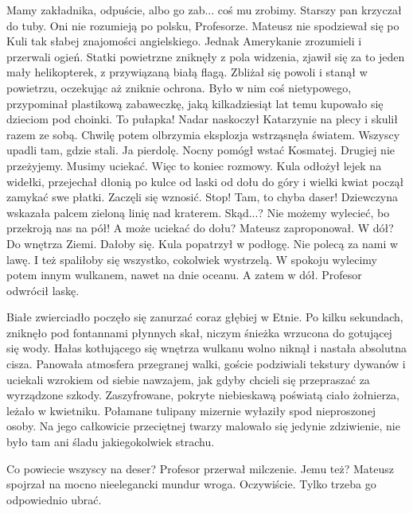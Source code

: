 \begin{dialogue}
\ds{} Mamy zakładnika, odpuście, albo go zab... coś mu zrobimy. \dm{} Starszy pan krzyczał do tuby.
\ds{} Oni nie rozumieją po polsku, Profesorze.
\ds{}  \dm{} Mateusz nie spodziewał się po Kuli tak słabej znajomości angielskiego. Jednak Amerykanie zrozumieli i przerwali ogień.
\ds{}  \dm{} Statki powietrzne zniknęły z pola widzenia, zjawił się za to jeden mały helikopterek, z przywiązaną białą flagą.
Zbliżał się powoli i stanął w powietrzu, oczekując aż zniknie ochrona. Było w nim coś nietypowego, przypominał plastikową zabaweczkę, jaką kilkadziesiąt lat temu kupowało się dzieciom pod choinki.
\ds{} To pułapka! \dm{} Nadar naskoczył Katarzynie na plecy i skulił razem ze sobą. Chwilę potem olbrzymia eksplozja wstrząsnęła światem. Wszyscy upadli tam, gdzie stali.
\ds{} Ja pierdolę. \dm{} Nocny pomógł wstać Kosmatej. \dm{} Drugiej nie przeżyjemy. Musimy uciekać.
\ds{} Więc to koniec rozmowy. \dm{} Kula odłożył lejek na widełki, przejechał dłonią po kulce od laski od dołu do góry i wielki kwiat począł zamykać swe płatki. Zaczęli się wznosić.
\ds{} Stop! Tam, to chyba daser! \dm{} Dziewczyna wskazała palcem zieloną linię nad kraterem.
\ds{} Skąd...?
\ds{} Nie możemy wylecieć, bo przekroją nas na pół!
\ds{} A może uciekać do dołu? \dm{} Mateusz zaproponował.
\ds{} W dół?
\ds{} Do wnętrza Ziemi.
\ds{} Dałoby się. \dm{} Kula popatrzył w podłogę.
\ds{} Nie polecą za nami w lawę.
\ds{} I też spaliłoby się wszystko, cokolwiek wystrzelą.
\ds{} W spokoju wylecimy potem innym wulkanem, nawet na dnie oceanu.
\ds{} A zatem w dół. \dm{} Profesor odwrócił laskę.
\end{dialogue}

Białe zwierciadło poczęło się zanurzać coraz głębiej w Etnie.
Po kilku sekundach, zniknęło pod fontannami płynnych skał, niczym śnieżka wrzucona do gotującej się wody.
Hałas kotłującego się wnętrza wulkanu wolno niknął i nastała absolutna cisza.
Panowała atmosfera przegranej walki, goście podziwiali tekstury dywanów i uciekali wzrokiem od siebie nawzajem, jak gdyby chcieli się przepraszać za wyrządzone szkody.
Zaszyfrowane, pokryte niebieskawą poświatą ciało żołnierza, leżało w kwietniku.
Połamane tulipany mizernie wyłaziły spod nieproszonej osoby.
Na jego całkowicie przeciętnej twarzy malowało się jedynie zdziwienie, nie było tam ani śladu jakiegokolwiek strachu.

\begin{dialogue}
\ds{} Co powiecie wszyscy na deser? \dm{} Profesor przerwał milczenie.
\ds{} Jemu też? \dm{} Mateusz spojrzał na mocno nieelegancki mundur wroga.
\ds{} Oczywiście. Tylko trzeba go odpowiednio ubrać.
\end{dialogue}

